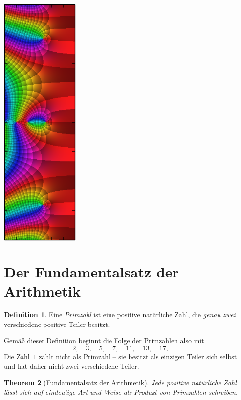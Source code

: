\documentclass[twoside]{../zirkelblatt1415}
\theoremstyle{definition}
\newtheorem{defn}{Definition}[section]
\theoremstyle{plain}
\newtheorem{thm}[defn]{Theorem}
\theoremstyle{remark}
\begin{document}

\begin{center}
\includegraphics[angle=90]{zeta-function-complex}
\end{center}

{\renewcommand{\addvspace}[1]{\vskip0.6em}
\tableofcontents%
}

\section{Der Fundamentalsatz der Arithmetik}

\begin{defn}Eine \emph{Primzahl} ist eine positive natürliche Zahl, die
\emph{genau zwei} verschiedene positive Teiler besitzt.\end{defn}

Gemäß dieser Definition beginnt die Folge der Primzahlen also mit
\[ 2, \quad 3, \quad 5, \quad 7, \quad 11, \quad 13, \quad 17, \quad \ldots \]
Die Zahl~$1$ zählt nicht als Primzahl -- sie besitzt als einzigen Teiler sich
selbst und hat daher nicht zwei verschiedene Teiler.

\begin{thm}[Fundamentalsatz der Arithmetik]Jede positive natürliche Zahl lässt
sich auf eindeutige Art und Weise als Produkt von Primzahlen
schreiben.\end{thm}
\end{document}
